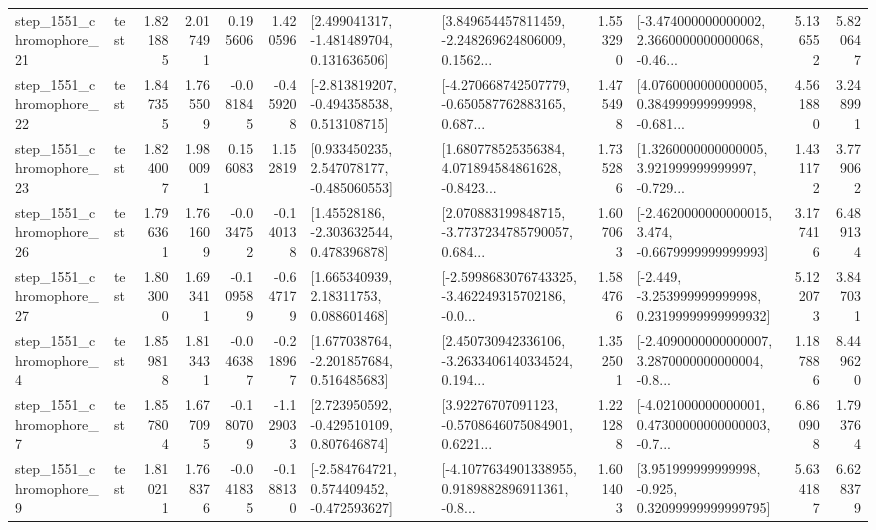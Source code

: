 \begin{tabular}{llrrrrllrlrr}
 step\_1551\_chromophore\_21 &      test &      1.821885 &    2.017491 &      0.195606 &  1.420596 &    [2.499041317, -1.481489704, 0.131636506] &  [3.849654457811459, -2.248269624806009, 0.1562... &       1.553290 &  [-3.474000000000002, 2.3660000000000068, -0.46... &            5.136552 &          5.820647 \\
 step\_1551\_chromophore\_22 &      test &      1.847355 &    1.765509 &     -0.081845 & -0.459208 &   [-2.813819207, -0.494358538, 0.513108715] &  [-4.270668742507779, -0.650587762883165, 0.687... &       1.475498 &  [4.0760000000000005, 0.384999999999998, -0.681... &            4.561880 &          3.248991 \\
 step\_1551\_chromophore\_23 &      test &      1.824007 &    1.980091 &      0.156083 &  1.152819 &    [0.933450235, 2.547078177, -0.485060553] &  [1.680778525356384, 4.071894584861628, -0.8423... &       1.735286 &  [1.3260000000000005, 3.921999999999997, -0.729... &            1.431172 &          3.779062 \\
 step\_1551\_chromophore\_26 &      test &      1.796361 &    1.761609 &     -0.034752 & -0.140138 &     [1.45528186, -2.303632544, 0.478396878] &  [2.070883199848715, -3.7737234785790057, 0.684... &       1.607063 &  [-2.4620000000000015, 3.474, -0.6679999999999993] &            3.177416 &          6.489134 \\
 step\_1551\_chromophore\_27 &      test &      1.803000 &    1.693411 &     -0.109589 & -0.647179 &      [1.665340939, 2.18311753, 0.088601468] &  [-2.5998683076743325, -3.462249315702186, -0.0... &       1.584766 &  [-2.449, -3.253999999999998, 0.23199999999999932] &            5.122073 &          3.847031 \\
  step\_1551\_chromophore\_4 &      test &      1.859818 &    1.813431 &     -0.046387 & -0.218967 &    [1.677038764, -2.201857684, 0.516485683] &  [2.450730942336106, -3.2633406140334524, 0.194... &       1.352501 &  [-2.4090000000000007, 3.2870000000000004, -0.8... &            1.187886 &          8.449620 \\
  step\_1551\_chromophore\_7 &      test &      1.857804 &    1.677095 &     -0.180709 & -1.129033 &    [2.723950592, -0.429510109, 0.807646874] &  [3.92276707091123, -0.5708646075084901, 0.6221... &       1.221288 &  [-4.021000000000001, 0.47300000000000003, -0.7... &            6.860908 &          1.793764 \\
  step\_1551\_chromophore\_9 &      test &      1.810211 &    1.768376 &     -0.041835 & -0.188130 &   [-2.584764721, 0.574409452, -0.472593627] &  [-4.1077634901338955, 0.9189882896911361, -0.8... &       1.601403 &   [3.951999999999998, -0.925, 0.32099999999999795] &            5.634187 &          6.628379 \\

\end{tabular}

